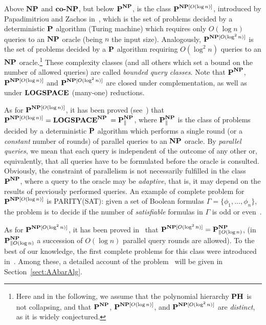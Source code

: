 Above $\textbf{NP}$ and $\textbf{co-}\textbf{NP}$, but below $\textbf{P}^{\textbf{NP}}$, is the class $\textbf{P}^{\textbf{NP}[O(\log n)]}$, introduced by Papadimitriou and Zachos in~\cite{Papadimitriou82}, which is the set of problems decided by a deterministic $\textbf{P}$ algorithm (Turing machine) which requires only $O(\log n)$ queries to an $\textbf{NP}$ oracle (being $n$ the input size). Analogously, $\textbf{P}^{\textbf{NP}[O(\log^2 n)]}$ is the set of problems decided by a $\textbf{P}$ algorithm requiring $O(\log^2 n)$ queries to an $\textbf{NP}$ oracle.\footnote{Here and in the following, we assume that the polynomial hierarchy $\textbf{PH}$ is not collapsing, and that $\textbf{P}^{\textbf{NP}}$, $\textbf{P}^{\textbf{NP}[O(\log n)]}$, and $\textbf{P}^{\textbf{NP}[O(\log^2 n)]}$ are \emph{distinct}, as it is widely conjectured.} These complexity classes (and all others which set a bound on the number of allowed queries) are called \emph{bounded query classes}. Note that $\textbf{P}^{\textbf{NP}}$, $\textbf{P}^{\textbf{NP}[O(\log n)]}$ and $\textbf{P}^{\textbf{NP}[O(\log^2 n)]}$ are closed under complementation, as well as under $\textbf{LOGSPACE}$ (many-one) reductions.

As for $\textbf{P}^{\textbf{NP}[O(\log n)]}$, it has been proved (see~\cite{buss1991,wagner90}) that $\textbf{P}^{\textbf{NP}[O(\log n)]} = \textbf{LOGSPACE}^{\textbf{NP}}$ $= \textbf{P}^{\textbf{NP}}_{\parallel}$, where $\textbf{P}^{\textbf{NP}}_{\parallel}$ is the class of problems decided by a deterministic $\textbf{P}$ algorithm which performs a single round (or a \emph{constant} number of rounds) of parallel queries to an $\textbf{NP}$ oracle. By \emph{parallel queries}, we mean that each query is independent of the outcome of any other or, equivalently, that all queries have to be formulated before the oracle is consulted. Obviously, the constraint of parallelism is not necessarily fulfilled in the class $\textbf{P}^{\textbf{NP}}$, where a query to the oracle may be \emph{adaptive}, that is, it  may depend on the results of previously performed queries.
%
An example of complete problem for $\textbf{P}^{\textbf{NP}[O(\log n)]}$ is PARITY(SAT): given a set of Boolean formulas $\Gamma=\{\phi_1,\ldots , \phi_n\}$, the problem is to decide if the number of \emph{satisfiable} formulas in $\Gamma$ is odd or even~\cite{WAGNER87}.

As for $\textbf{P}^{\textbf{NP}[O(\log^2 n)]}$, it has been proved in~\cite{castro92} that $\textbf{P}^{\textbf{NP}[O(\log^2 n)]}=\textbf{P}^{\textbf{NP}}_{\parallel O(\log n)}$, (in $\textbf{P}^{\textbf{NP}}_{\parallel O(\log n)}$ a succession of $O(\log n)$ parallel query rounds are allowed). To the best of our knowledge, the first complete problems for this class were introduced in~\cite{schnoebelen2003}. Among these, a detailed account of the problem \TBSATM \ will be given in Section~\ref{sect:AAbarAlg}.

